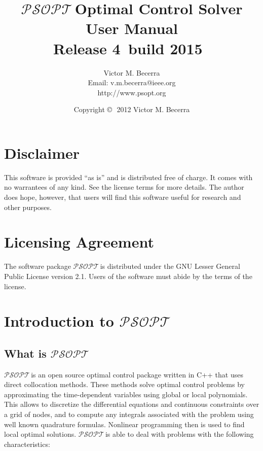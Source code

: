 \documentclass[a4paper,11pt]{report}    %
\newcommand{\psopt}{$\mathcal{PSOPT}$\,}  %
\newcommand{\release}{Release 4 \,}
\newcommand{\build}{build 2015 \,}
\newenvironment{shadedframe}{%
  \def\FrameCommand{\fcolorbox{black}{shadecolor}}%
  \MakeFramed {\FrameRestore}}
{\endMakeFramed}
\begin{document}
\title{\psopt Optimal Control Solver\\ User Manual \\ \small \release \build \normalsize }

\author{Victor M. Becerra \\ Email: v.m.becerra@ieee.org  \\ http://www.psopt.org}

\date{Copyright \copyright \,\, 2012 Victor M. Becerra}


\maketitle

\chapter*{Disclaimer}

This software is provided ``as is'' and is distributed free of charge. It comes with
no warrantees of any kind. See the license terms
for more details.  The author does hope, however, that users 
will find this software useful for research and other purposes. 

\chapter*{Licensing Agreement}
The software package \psopt is distributed under the GNU Lesser General Public License version 2.1.
Users of the software must abide by the terms of the license.

\scriptsize
\begin{shadedframe}

\end{shadedframe}
\normalsize


\tableofcontents


\chapter{Introduction to \psopt}

\section{What is \psopt}

\psopt is an open source optimal control package written in C++ that uses direct collocation methods. 
These methods solve optimal control problems by approximating the time-dependent variables using global or local polynomials.
This allows to discretize the differential equations and continuous constraints
over a grid of nodes, and to compute any integrals associated with the problem using well known quadrature formulas. 
Nonlinear programming then is used to find local optimal
solutions. \psopt is able to deal with problems with the following characteristics:
\end{document}
